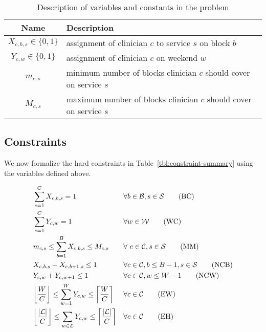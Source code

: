 \begin{table}[h]
	\centering
  \caption{Description of variables and constants in the problem}%
  \label{tbl:variables-constants}
	\begin{tabular}{ c l }
		\toprule
		\textbf{Name}              & \textbf{Description}                             
		\\ \midrule
		$X_{c, b, s} \in \{0, 1\}$ & assignment of clinician $c$ to service $s$ on
		block $b$            \\
		$Y_{c, w} \in \{0, 1\}$    & assignment of clinician $c$ on weekend $w$       
		\\
		$m_{c, s}$                 & minimum number of blocks clinician $c$ should
		cover on service $s$ \\
		$M_{c, s}$                 & maximum number of blocks clinician $c$ should
		cover on service $s$ \\
    \bottomrule
	\end{tabular}
\end{table}

\subsection{Constraints}\label{sec:meth-constraints}
We now formalize the hard constraints in Table~\ref{tbl:constraint-summary}
using the variables defined above.

\begin{align}
&\sum_{c=1}^{C} X_{c, b, s} = 1 &&\forall b\in \mathcal{B}, s \in \mathcal{S}
\tag{BC} \label{eqn:constr-block-cov} \\
&\sum_{c=1}^{C} Y_{c, w} = 1 &&\forall w\in \mathcal{W} \tag{WC}
\label{eqn:constr-weekend-cov} \\
&m_{c, s} \leq \sum_{b=1}^{B} X_{c, b, s} \leq M_{c, s} &&\forall\
c\in\mathcal{C}, s\in\mathcal{S} \tag{MM} \label{eqn:constr-min-max} \\
&X_{c, b, s} + X_{c, b + 1, s} \leq 1 &&\forall c\in\mathcal{C}, b \leq B - 1,
s\in\mathcal{S} \tag{NCB} \label{eqn:constr-no-consec-blocks} \\
&Y_{c, w} + Y_{c, w + 1} \leq 1 &&\forall c\in\mathcal{C}, w \leq W - 1
\tag{NCW} \label{eqn:constr-no-consec-weekends} \\
&\floor*{\frac{W}{C}} \leq \sum_{w=1}^W Y_{c, w} \leq \ceil*{\frac{W}{C}}
&&\forall c\in\mathcal{C} \tag{EW} \label{eqn:constr-equal-weekends} \\
&\floor*{\frac{\abs{\mathcal{L}}}{C}} \leq \sum_{w\in\mathcal{L}} Y_{c, w} \leq
\ceil*{\frac{\abs{\mathcal{L}}}{C}} &&\forall c\in\mathcal{C} \tag{EH}
\label{eqn:constr-equal-holidays}
\end{align}

